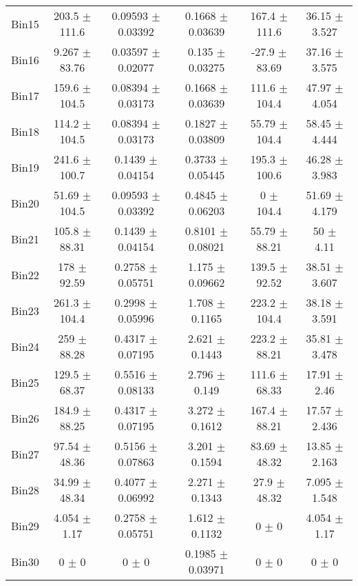 \begin{tabular}{@{\extracolsep{4pt}}lccccc@{}}
     Bin15 & 203.5 $\pm$ 111.6 & 0.09593 $\pm$ 0.03392 & 0.1668 $\pm$ 0.03639 & 167.4 $\pm$ 111.6 & 36.15 $\pm$ 3.527 \\ 
     Bin16 & 9.267 $\pm$ 83.76 & 0.03597 $\pm$ 0.02077 & 0.135 $\pm$ 0.03275 & -27.9 $\pm$ 83.69 & 37.16 $\pm$ 3.575 \\ 
     Bin17 & 159.6 $\pm$ 104.5 & 0.08394 $\pm$ 0.03173 & 0.1668 $\pm$ 0.03639 & 111.6 $\pm$ 104.4 & 47.97 $\pm$ 4.054 \\ 
     Bin18 & 114.2 $\pm$ 104.5 & 0.08394 $\pm$ 0.03173 & 0.1827 $\pm$ 0.03809 & 55.79 $\pm$ 104.4 & 58.45 $\pm$ 4.444 \\ 
     Bin19 & 241.6 $\pm$ 100.7 & 0.1439 $\pm$ 0.04154 & 0.3733 $\pm$ 0.05445 & 195.3 $\pm$ 100.6 & 46.28 $\pm$ 3.983 \\ 
     Bin20 & 51.69 $\pm$ 104.5 & 0.09593 $\pm$ 0.03392 & 0.4845 $\pm$ 0.06203 & 0 $\pm$ 104.4 & 51.69 $\pm$ 4.179 \\ 
     Bin21 & 105.8 $\pm$ 88.31 & 0.1439 $\pm$ 0.04154 & 0.8101 $\pm$ 0.08021 & 55.79 $\pm$ 88.21 & 50 $\pm$ 4.11 \\ 
     Bin22 & 178 $\pm$ 92.59 & 0.2758 $\pm$ 0.05751 & 1.175 $\pm$ 0.09662 & 139.5 $\pm$ 92.52 & 38.51 $\pm$ 3.607 \\ 
     Bin23 & 261.3 $\pm$ 104.4 & 0.2998 $\pm$ 0.05996 & 1.708 $\pm$ 0.1165 & 223.2 $\pm$ 104.4 & 38.18 $\pm$ 3.591 \\ 
     Bin24 & 259 $\pm$ 88.28 & 0.4317 $\pm$ 0.07195 & 2.621 $\pm$ 0.1443 & 223.2 $\pm$ 88.21 & 35.81 $\pm$ 3.478 \\ 
     Bin25 & 129.5 $\pm$ 68.37 & 0.5516 $\pm$ 0.08133 & 2.796 $\pm$ 0.149 & 111.6 $\pm$ 68.33 & 17.91 $\pm$ 2.46 \\ 
     Bin26 & 184.9 $\pm$ 88.25 & 0.4317 $\pm$ 0.07195 & 3.272 $\pm$ 0.1612 & 167.4 $\pm$ 88.21 & 17.57 $\pm$ 2.436 \\ 
     Bin27 & 97.54 $\pm$ 48.36 & 0.5156 $\pm$ 0.07863 & 3.201 $\pm$ 0.1594 & 83.69 $\pm$ 48.32 & 13.85 $\pm$ 2.163 \\ 
     Bin28 & 34.99 $\pm$ 48.34 & 0.4077 $\pm$ 0.06992 & 2.271 $\pm$ 0.1343 & 27.9 $\pm$ 48.32 & 7.095 $\pm$ 1.548 \\ 
     Bin29 & 4.054 $\pm$ 1.17 & 0.2758 $\pm$ 0.05751 & 1.612 $\pm$ 0.1132 & 0 $\pm$ 0 & 4.054 $\pm$ 1.17 \\ 
     Bin30 & 0 $\pm$ 0 & 0 $\pm$ 0 & 0.1985 $\pm$ 0.03971 & 0 $\pm$ 0 & 0 $\pm$ 0 \\ 
\hline\hline
  \end{tabular}
